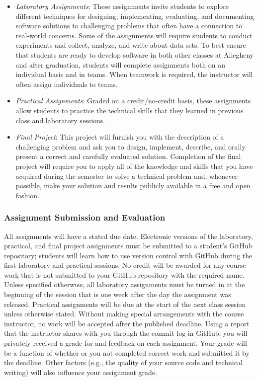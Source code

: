 \documentclass[11pt]{article}
\begin{document}
\begin{itemize}
  \item {\em Laboratory Assignments\/}: These assignments invite students to
    explore different techniques for designing, implementing, evaluating, and
    documenting software solutions to challenging problems that often have a
    connection to real-world concerns. Some of the assignments will require
    students to conduct experiments and collect, analyze, and write about data
    sets. To best ensure that students are ready to develop software in both
    other classes at Allegheny and after graduation, students will complete
    assignments both on an individual basis and in teams. When teamwork is
    required, the instructor will often assign individuals to teams.

  \item {\em Practical Assignments\/}: Graded on a credit/no-credit basis, these
    assignments allow students to practice the technical skills that they
    learned in previous class and laboratory sessions.

  \item {\em Final Project\/}: This project will furnish you with the
    description of a challenging problem and ask you to design, implement,
    describe, and orally present a correct and carefully evaluated solution.
    Completion of the final project will require you to apply all of the
    knowledge and skills that you have acquired during the semester to solve a
    technical problem and, whenever possible, make your solution and results
    publicly available in a free and open fashion.

\end{itemize}

\subsubsection*{Assignment Submission and Evaluation}

All assignments will have a stated due date. Electronic versions of the
laboratory, practical, and final project assignments must be submitted to a
student's GitHub repository; students will learn how to use version control with
GitHub during the first laboratory and practical sessions. No credit will be
awarded for any course work that is not submitted to your GitHub repository with
the required name. Unless specified otherwise, all laboratory assignments must
be turned in at the beginning of the session that is one week after the day the
assignment was released. Practical assignments will be due at the start of the
next class session unless otherwise stated. Without making special arrangements
with the course instructor, no work will be accepted after the published
deadline. Using a report that the instructor shares with you through the commit
log in GitHub, you will privately received a grade for and feedback on each
assignment. Your grade will be a function of whether or you not completed
correct work and submitted it by the deadline. Other factors (e.g., the quality
of your source code and technical writing) will also influence your assignment
grade.
\end{document}
